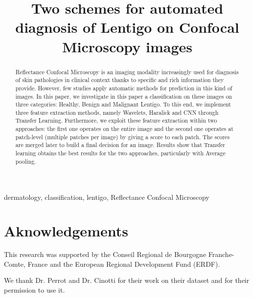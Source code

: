 \documentclass[10pt, conference, compsocconf]{IEEEtran}
\begin{document}
\title{Two schemes for automated diagnosis of Lentigo on Confocal Microscopy images}

\author{
        \and
        }
        

\maketitle

\begin{abstract}
    Reflectance Confocal Microscopy is an imaging modality increasingly used for diagnosis of skin pathologies in clinical context thanks to specific and rich information they provide. However, few studies apply automatic methods for prediction in this kind of images. In this paper, we investigate in this paper a classification on these images on three categories: Healthy, Benign and Malignant Lentigo. To this end, we implement three feature extraction methods, namely Wavelets, Haralick and CNN through Transfer Learning. Furthermore, we exploit these feature extraction within two approaches: the first one operates on the entire image and the second one operates at patch-level (multiple patches per image) by giving a score to each patch. The scores are merged later to build a final decision for an image. Results show that Transfer learning obtains the best results for the two approaches, particularly with Average pooling. 
\end{abstract}

\begin{IEEEkeywords}
    dermatology, classification, lentigo, Reflectance Confocal Microscopy
\end{IEEEkeywords}

\IEEEpeerreviewmaketitle






\section*{Aknowledgements}
This research was supported by the Conseil Regional de Bourgogne Franche-Comte, France and the European Regional Development Fund (ERDF).\par
We thank Dr. Perrot and Dr. Cinotti for their work on their dataset and for their permission to use it.\par

{\small
\printbibliography
}

\end{document}
